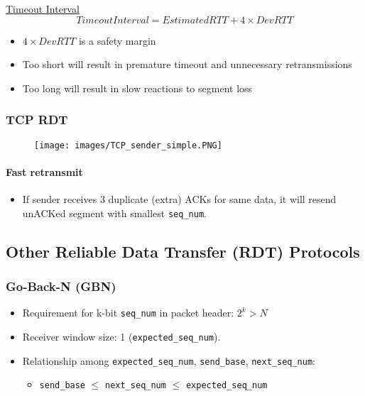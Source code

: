 \documentclass[a4paper]{article}
\begin{document}
\noindent\underline{Timeout Interval}
$$ TimeoutInterval = EstimatedRTT + 4\times DevRTT $$

\begin{itemize}
    \item $4\times DevRTT$ is a safety margin
    \item Too short will result in premature timeout and unnecessary retransmissions
    \item Too long will result in slow reactions to segment loss
\end{itemize}

\subsubsection{TCP RDT}
\begin{figure}[H]
    \centering
    \texttt{[image: images/TCP\_sender\_simple.PNG]}
\end{figure}

\paragraph{Fast retransmit}
\begin{itemize}
    \item If sender receives 3 duplicate (extra) ACKs for same data, it will resend unACKed segment with smallest \texttt{seq\_num}.
\end{itemize}

\subsection{Other Reliable Data Transfer (RDT) Protocols}
\subsubsection{Go-Back-N (GBN)}
\begin{itemize}
    \item Requirement for k-bit \texttt{seq\_num} in packet header: $2^k > N$
    \item Receiver window size: 1 (\texttt{expected\_seq\_num}).
    \item Relationship among \texttt{expected\_seq\_num}, \texttt{send\_base}, \texttt{next\_seq\_num}:
    \begin{itemize}[label=$\circ$]
        \item \texttt{send\_base} $\leq$ \texttt{next\_seq\_num} $\leq$ \texttt{expected\_seq\_num}
    \end{itemize} 
\end{itemize}
\end{document}
